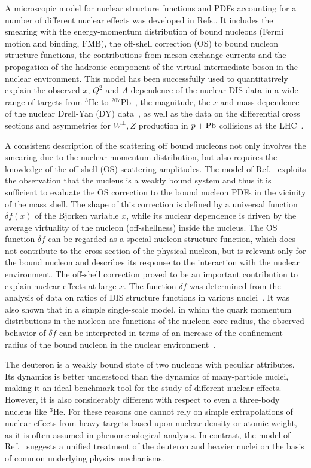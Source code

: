 \documentclass[%
      aps,
      prd,
      floatfix,
      preprintnumbers,
      preprint,
      showpacs,
      nofootinbib,
      tightenlines,
      amssymb,
      amsmath
]{revtex4-1}
\begin{document}
A microscopic model for nuclear structure functions and PDFs 
accounting for a number of different nuclear effects was developed in Refs.\cite{KP04,KP07,KP10,KP14}. 
It includes the smearing with the energy-momentum distribution 
of bound nucleons (Fermi motion and binding, FMB), the off-shell correction (OS) to bound nucleon structure functions, 
the contributions from meson exchange currents and the propagation of the hadronic component of the 
virtual intermediate boson in the nuclear environment.
This model has been successfully used to quantitatively explain the 
observed $x$, $Q^2$ and $A$ dependence of 
the nuclear DIS data in a wide range of targets from ${}^3$He to ${}^{207}$Pb~\cite{KP04,KP07,KP10}, 
the magnitude, the $x$ and mass dependence of the nuclear Drell-Yan (DY) data~\cite{KP14}, as well as the data on  
the differential cross sections and asymmetries for $W^\pm,Z$ production in $p+{\rm Pb}$ collisions 
at the LHC~\cite{Ru:2016wfx}.  

A consistent description of the scattering off bound nucleons not only involves  
the smearing due to the nuclear momentum distribution, but also requires the knowledge of 
the off-shell (OS) scattering amplitudes.
The model of Ref.~\cite{KP04} exploits the observation that the nucleus is a weakly bound system and thus
it is sufficient to evaluate the OS correction to the bound nucleon PDFs in the vicinity of the mass shell.
The shape of this correction is defined by a universal function $\delta f(x)$ of the Bjorken variable $x$, 
while its nuclear dependence is driven by the average virtuality of the nucleon (off-shellness) inside 
the nucleus. 
The OS function $\delta f$ can be regarded as a special nucleon structure function, which 
does not contribute to the cross section of the physical nucleon, 
but is relevant only for the bound nucleon and describes its
response to the interaction with the nuclear environment.
The off-shell correction proved to be an important contribution to explain nuclear effects
at large $x$. The function $\delta f$ was determined from the analysis of data on ratios of
DIS structure functions in various nuclei~\cite{KP04}. 
It was also shown that in a simple single-scale model,
in which the quark momentum distributions in the nucleon
are functions of the nucleon core radius, the observed behavior of $\delta f$ can be
interpreted in terms of an increase of the confinement radius 
of the bound nucleon in the nuclear environment~\cite{KP04}. 

The deuteron is a weakly bound state of two nucleons with peculiar attributes. 
Its dynamics is better understood than the dynamics 
of many-particle nuclei, making it an ideal benchmark tool for the study of different nuclear effects. 
However, it is also considerably different with respect to 
even a three-body nucleus like ${}^3$He. For these reasons one cannot rely on simple extrapolations 
of nuclear effects from heavy targets based upon nuclear density or atomic weight, as it is 
often assumed in phenomenological analyses. In contrast, 
the model of Ref.~\cite{KP04} suggests a unified treatment of the deuteron and heavier nuclei 
on the basis of common underlying physics mechanisms. 
\end{document}
